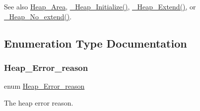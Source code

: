 \begin{DoxySeeAlso}{See also}
\mbox{\hyperlink{structHeap__Area}{Heap\+\_\+\+Area}}, \mbox{\hyperlink{group__RTEMSScoreHeap_gac5974c7ccf84c152ba6c8e17bea3ca5f}{\+\_\+\+Heap\+\_\+\+Initialize()}}, \mbox{\hyperlink{group__RTEMSScoreHeap_ga7484f40d81ae26a7f5b3773a2dd006be}{\+\_\+\+Heap\+\_\+\+Extend()}}, or \mbox{\hyperlink{group__RTEMSScoreHeap_ga34c79fc0ef24f7bff393aedccff17a29}{\+\_\+\+Heap\+\_\+\+No\+\_\+extend()}}. 
\end{DoxySeeAlso}


\subsection{Enumeration Type Documentation}
\mbox{\label{group__RTEMSScoreHeap_ga9f62692d135584572333cc6d1759e5e4}} 
\subsubsection{\texorpdfstring{Heap\_Error\_reason}{Heap\_Error\_reason}}
{\footnotesize\ttfamily enum \mbox{\hyperlink{group__RTEMSScoreHeap_ga9f62692d135584572333cc6d1759e5e4}{Heap\+\_\+\+Error\+\_\+reason}}}



The heap error reason. 

